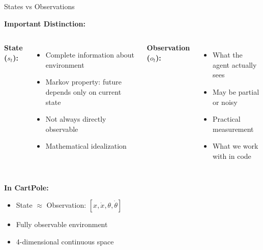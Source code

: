 \documentclass[aspectratio=169,10pt]{beamer}
\begin{document}
\begin{frame}{States vs Observations}

\textbf{Important Distinction:}

\vfill

\begin{columns}[t]
\textbf{State ($s_t$):}
\begin{itemize}
    \item Complete information about environment
    \item Markov property: future depends only on current state
    \item Not always directly observable
    \item Mathematical idealization
\end{itemize}

\textbf{Observation ($o_t$):}
\begin{itemize}
    \item What the agent actually sees
    \item May be partial or noisy
    \item Practical measurement
    \item What we work with in code
\end{itemize}
\end{columns}

\vfill

\textbf{In CartPole:}
\begin{itemize}
    \item State $\approx$ Observation: $[x, \dot{x}, \theta, \dot{\theta}]$
    \item Fully observable environment
    \item 4-dimensional continuous space
\end{itemize}

\end{frame}
\end{document}
